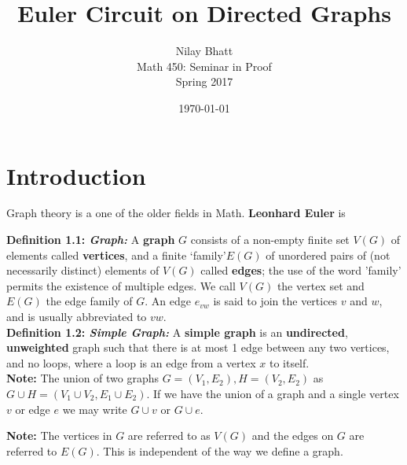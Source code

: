 \documentclass[17pt]{article}
\begin{document}
\title{Euler Circuit on Directed Graphs}
\author{Nilay Bhatt \\ Math 450: Seminar in Proof \\ Spring 2017}
\date{\today}
\maketitle
{}

\newpage

\section{Introduction}
Graph theory is a one of the older fields in Math. \textbf{Leonhard Euler} is 

\textbf{Definition 1.1: \textit{Graph: }}A \textbf{graph} $G$ consists of a non-empty finite set $V(G)$ of elements called \textbf{vertices},
and a finite \lq family\rq $ E(G)$ of unordered pairs of (not necessarily distinct) elements
of $V(G)$ called \textbf{edges}; the use of the word 'family' permits the existence of multiple edges. We call $V(G)$ the vertex set and $E(G)$ the edge family of $G$. An edge $e_{vw}$ is said to join the vertices $v$ and $w$, and is usually abbreviated to $vw$. \\

\textbf{Definition 1.2: \textit{Simple Graph:}} A \textbf{simple graph} is an \textbf{undirected}, \textbf{unweighted} graph such that there is at most 1 edge between any two vertices, and no loops, where a loop is an edge from a vertex $x$ to itself.\\ \textbf{Note:} The union of two graphs $G = (V_1,E_2),H = (V_2,E_2)$ as $G\cup H = (V_1\cup V_2, E_1 \cup E_2)$. If we have the union of a graph and a single vertex $v$ or edge $e$ we may write $G\cup v$ or $G\cup e$.\newline

\textbf{Note:}	The vertices in $G$ are referred to as $V(G)$ and the edges on $G$ are referred to $E(G)$. This is independent of the way we define a graph.\\
\end{document}
